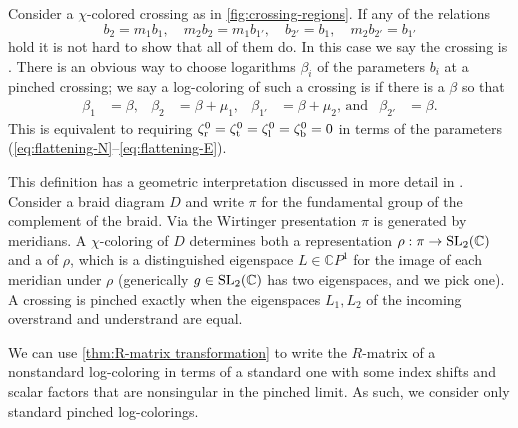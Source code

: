 \documentclass{sl2ams}
\numberwithin{equation}{section}
\begin{document}
\begin{definition}
  \label{def:standard-flattening}
  Consider a \(\chi\)-colored crossing as in \cref{fig:crossing-regions}.
  If any of the relations
  \begin{equation}
    \label{eq:pinched-crossing-conditions}
    b_2 = m_1 b_1
    ,\quad
    m_2 b_2 = m_1 b_{1'}
    ,\quad
    b_{2'} = b_{1}
    ,\quad
    m_2 b_{2'} = b_{1'}
  \end{equation}
  hold it is not hard to show that all of them do.
  In this case we say the crossing is .
  There is an obvious way to choose logarithms \(\beta_i\) of the parameters \(b_i\) at a pinched crossing; we say a log-coloring of such a crossing is  if there is a \(\beta\) so that
  \begin{align}
    \label{eq:standard-flattening}
    \beta_{1} &= \beta,
              &
    \beta_{2} &= \beta + \mu_1,
              &
    \beta_{1'} &= \beta + \mu_2\text{, and}
               &
    \beta_{2'} &= \beta.
  \end{align}
  This is equivalent to requiring
  \(\zeta_{\mathrm{r}}^0 = \zeta_{\mathrm{t}}^0 = \zeta_{\mathrm{l}}^0 = \zeta_{\mathrm{b}}^0 = 0\)
  in terms of the parameters (\ref{eq:flattening-N}--\ref{eq:flattening-E}).
\end{definition}

\begin{remark}
  \label{rem:pinched eigenlines}
  This definition has a geometric interpretation discussed in more detail in \cite{McPhailSnyder2024}.
  Consider a braid diagram \(D\) and write \(\pi\) for the fundamental group of the complement of the braid.
  Via the Wirtinger presentation \(\pi\) is generated by meridians.
  A \(\chi\)-coloring of \(D\) determines both a representation \(\rho : \pi \to \operatorname{SL}_2(\mathbb{C})\) and a  of \(\rho\), which is a distinguished eigenspace \(L \in \mathbb{C}P^1\) for the image of each meridian under \(\rho\) (generically \(g \in \operatorname{SL}_2(\mathbb{C})\) has two eigenspaces, and we pick one).
  A crossing is pinched exactly when the eigenspaces \(L_{1}, L_{2}\) of the incoming overstrand and understrand are equal.
\end{remark}


\begin{remark}
  \label{rem:standard-flattening}
  We can use \cref{thm:R-matrix transformation} to write the \(R\)-matrix of a nonstandard log-coloring in terms of a standard one with some index shifts and scalar factors that are nonsingular in the pinched limit.
  As such, we consider only standard pinched log-colorings.
\end{remark}
\end{document}
